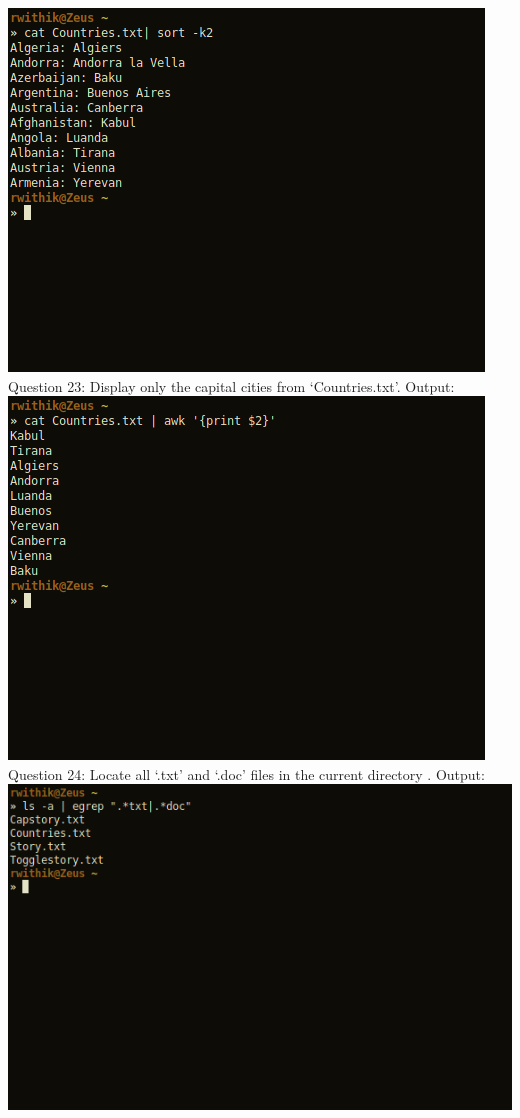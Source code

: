 \documentclass[10pt,a4paper,titlepage]{report}
\begin{document}
\includegraphics[scale=.5]{../Images/Cycle2/22.png}\pagebreak
\newline
Question 23: Display only the capital cities from ‘Countries.txt’.\newline
Output:\newline
\includegraphics[scale=.5]{../Images/Cycle2/23.png}\newline
\newline
Question 24: Locate all ‘.txt’ and ‘.doc’ files in the current directory .\newline
Output:\newline
\includegraphics[scale=.5]{../Images/Cycle2/24.png}\pagebreak
\end{document}
